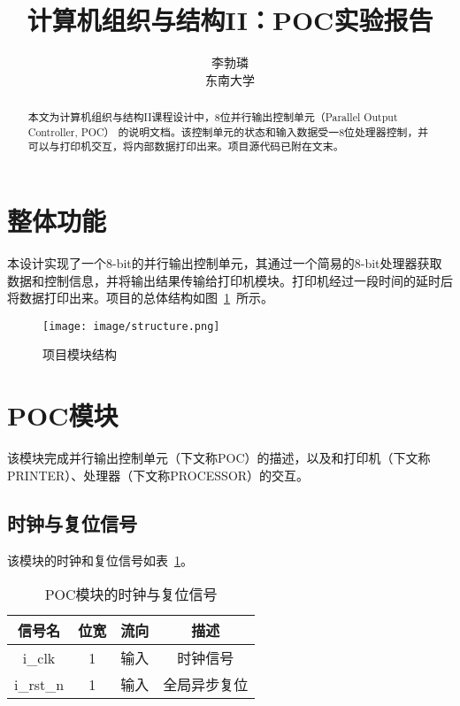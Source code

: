 \documentclass[lang=cn,a4paper,newtx]{elegantpaper}
\title{计算机组织与结构II：POC实验报告}
\author{李勃璘 \\ 东南大学}
\date{\zhdate{2025/3/18}}
\begin{document}
\maketitle

\begin{abstract}
本文为计算机组织与结构II课程设计中，8位并行输出控制单元（Parallel Output Controller, POC） 的说明文档。该控制单元的状态和输入数据受一8位处理器控制，并可以与打印机交互，将内部数据打印出来。项目源代码已附在文末。
\end{abstract}

\section{整体功能}
本设计实现了一个8-bit的并行输出控制单元，其通过一个简易的8-bit处理器获取数据和控制信息，并将输出结果传输给打印机模块。打印机经过一段时间的延时后将数据打印出来。项目的总体结构如图~\ref{fig:structure}~所示。
\begin{figure}[htbp]
    \centering
    \texttt{[image: image/structure.png]}
    \caption{项目模块结构}
    \label{fig:structure}
\end{figure}

\section{POC模块}
该模块完成并行输出控制单元（下文称POC）的描述，以及和打印机（下文称PRINTER）、处理器（下文称PROCESSOR）的交互。
\subsection{时钟与复位信号}
该模块的时钟和复位信号如表~\ref{tab:clk_poc}。
\begin{table}[htbp]
    \centering
    \renewcommand{\arraystretch}{1.2} %
    \begin{tabular}{c c c c}
        \toprule
        信号名 & 位宽 & 流向 & 描述 \\
        \midrule
        i\_clk   & 1 & 输入 & 时钟信号\\
        i\_rst\_n & 1 & 输入 & 全局异步复位\\
        \bottomrule
    \end{tabular}
    \caption{POC模块的时钟与复位信号}
    \label{tab:clk_poc}
\end{table}
\end{document}
